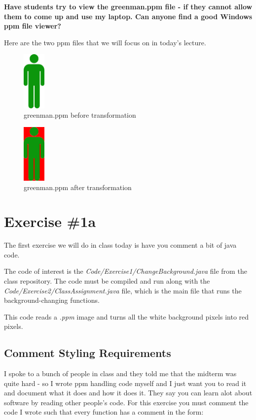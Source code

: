 \documentclass[12pt]{article}
\begin{document}
\begin{center}
\textbf{Have students try to view the greenman.ppm file - if they cannot allow them to come up and use my laptop. Can anyone find a good Windows ppm file viewer?}
\end{center}

Here are the two ppm files that we will focus on in today's lecture.

\begin{figure}[h]
  \centering
    \includegraphics[width=0.1\textwidth]{greenman.png}
  \caption{greenman.ppm before transformation}
\end{figure}

\begin{figure}[h]
  \centering
    \includegraphics[width=0.1\textwidth]{output.png}
  \caption{greenman.ppm after transformation}
\end{figure}


\section{Exercise \#1a}
The first exercise we will do in class today is have you comment a bit of java code. 

The code of interest is the \textit{Code/Exercise1/ChangeBackground.java} file from the class repository. The code must be compiled and run along with the \textit{Code/Exercise2/ClassAssignment.java} file, which is the main file that runs the background-changing functions.

This code reads a \textit{.ppm} image and turns all the white background pixels into red pixels.

\subsection{ Comment Styling Requirements }
I spoke to a bunch of people in class and they told me that the midterm was quite hard - so I wrote ppm handling code myself and I just want you to read it and document what it does and how it does it. They say you can learn alot about software by reading other people's code. For this exercise you must comment the code I wrote such that every function has a comment in the form:
\end{document}
